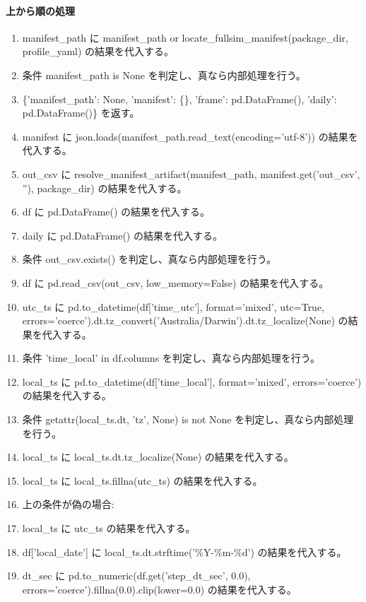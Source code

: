 \documentclass[a4paper,11pt]{article}
\begin{document}
            \paragraph{上から順の処理}
            \begin{enumerate}[leftmargin=1.8em]
            \item manifest\_path に manifest\_path or locate\_fullsim\_manifest(package\_dir, profile\_yaml) の結果を代入する。
\item 条件 manifest\_path is None を判定し、真なら内部処理を行う。
\item   \{'manifest\_path': None, 'manifest': \{\}, 'frame': pd.DataFrame(), 'daily': pd.DataFrame()\} を返す。
\item manifest に json.loads(manifest\_path.read\_text(encoding='utf-8')) の結果を代入する。
\item out\_csv に resolve\_manifest\_artifact(manifest\_path, manifest.get('out\_csv', ''), package\_dir) の結果を代入する。
\item df に pd.DataFrame() の結果を代入する。
\item daily に pd.DataFrame() の結果を代入する。
\item 条件 out\_csv.exists() を判定し、真なら内部処理を行う。
\item   df に pd.read\_csv(out\_csv, low\_memory=False) の結果を代入する。
\item   utc\_ts に pd.to\_datetime(df['time\_utc'], format='mixed', utc=True, errors='coerce').dt.tz\_convert('Australia/Darwin').dt.tz\_localize(None) の結果を代入する。
\item   条件 'time\_local' in df.columns を判定し、真なら内部処理を行う。
\item     local\_ts に pd.to\_datetime(df['time\_local'], format='mixed', errors='coerce') の結果を代入する。
\item     条件 getattr(local\_ts.dt, 'tz', None) is not None を判定し、真なら内部処理を行う。
\item       local\_ts に local\_ts.dt.tz\_localize(None) の結果を代入する。
\item     local\_ts に local\_ts.fillna(utc\_ts) の結果を代入する。
\item     上の条件が偽の場合:
\item     local\_ts に utc\_ts の結果を代入する。
\item   df['local\_date'] に local\_ts.dt.strftime('\%Y-\%m-\%d') の結果を代入する。
\item   dt\_sec に pd.to\_numeric(df.get('step\_dt\_sec', 0.0), errors='coerce').fillna(0.0).clip(lower=0.0) の結果を代入する。

\end{enumerate}
\end{document}
